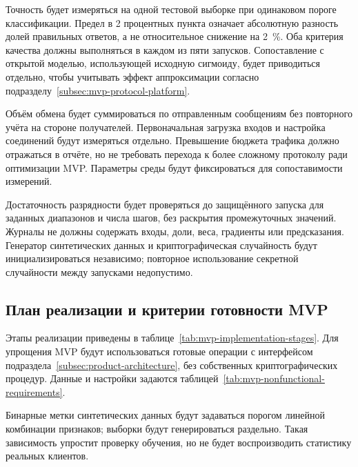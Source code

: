 Точность будет измеряться на одной тестовой выборке при одинаковом пороге классификации. Предел в 2 процентных пункта означает абсолютную разность долей правильных ответов, а не относительное снижение на 2~\%. Оба критерия качества должны выполняться в каждом из пяти запусков. Сопоставление с открытой моделью, использующей исходную сигмоиду, будет приводиться отдельно, чтобы учитывать эффект аппроксимации согласно подразделу~\ref{subsec:mvp-protocol-platform}.

Объём обмена будет суммироваться по отправленным сообщениям без повторного учёта на стороне получателей. Первоначальная загрузка входов и настройка соединений будут измеряться отдельно. Превышение бюджета трафика должно отражаться в отчёте, но не требовать перехода к более сложному протоколу ради оптимизации MVP. Параметры среды будут фиксироваться для сопоставимости измерений.

Достаточность разрядности будет проверяться до защищённого запуска для заданных диапазонов и числа шагов, без раскрытия промежуточных значений. Журналы не должны содержать входы, доли, веса, градиенты или предсказания. Генератор синтетических данных и криптографическая случайность будут инициализироваться независимо; повторное использование секретной случайности между запусками недопустимо.

\subsection{План реализации и критерии готовности MVP}
\label{subsec:mvp-implementation-plan}

Этапы реализации приведены в таблице~\ref{tab:mvp-implementation-stages}. Для упрощения MVP будут использоваться готовые операции с интерфейсом подраздела~\ref{subsec:product-architecture}, без собственных криптографических процедур. Данные и настройки задаются таблицей~\ref{tab:mvp-nonfunctional-requirements}.

Бинарные метки синтетических данных будут задаваться порогом линейной комбинации признаков; выборки будут генерироваться раздельно. Такая зависимость упростит проверку обучения, но не будет воспроизводить статистику реальных клиентов.

